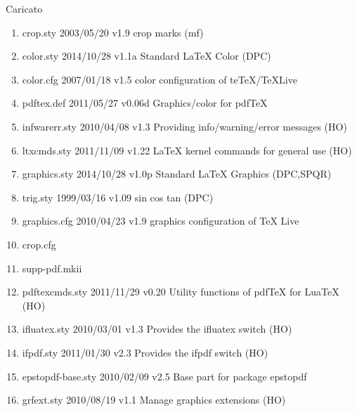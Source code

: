 Caricato 
\begin{enumerate}
\item crop.sty 2003/05/20 v1.9 crop marks (mf)
\item color.sty 2014/10/28 v1.1a Standard LaTeX Color (DPC)
\item color.cfg 2007/01/18 v1.5 color configuration of teTeX/TeXLive
\item pdftex.def 2011/05/27 v0.06d Graphics/color for pdfTeX
\item infwarerr.sty 2010/04/08 v1.3 Providing info/warning/error messages (HO)
\item ltxcmds.sty 2011/11/09 v1.22 LaTeX kernel commands for general use (HO)
\item graphics.sty 2014/10/28 v1.0p Standard LaTeX Graphics (DPC,SPQR)
\item trig.sty 1999/03/16 v1.09 sin cos tan (DPC)
\item graphics.cfg 2010/04/23 v1.9 graphics configuration of TeX Live
\item crop.cfg
\item supp-pdf.mkii
\item pdftexcmds.sty 2011/11/29 v0.20 Utility functions of pdfTeX for LuaTeX (HO)
\item ifluatex.sty 2010/03/01 v1.3 Provides the ifluatex switch (HO)
\item ifpdf.sty 2011/01/30 v2.3 Provides the ifpdf switch (HO)
\item epstopdf-base.sty 2010/02/09 v2.5 Base part for package epstopdf
\item grfext.sty 2010/08/19 v1.1 Manage graphics extensions (HO)

\end{enumerate}
